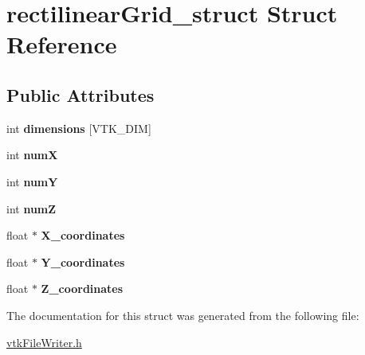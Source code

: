 \hypertarget{structrectilinearGrid__struct}{
\section{rectilinearGrid\_\-struct Struct Reference}
\label{structrectilinearGrid__struct}
}
\subsection*{Public Attributes}
\begin{DoxyCompactItemize}
\item 
\hypertarget{structrectilinearGrid__struct_ad8e386ae3171b95a18b873f47be1631e}{
int {\bfseries dimensions} \mbox{[}VTK\_\-DIM\mbox{]}}
\label{structrectilinearGrid__struct_ad8e386ae3171b95a18b873f47be1631e}

\item 
\hypertarget{structrectilinearGrid__struct_aa44d3f7a3b83d79c852e66b2ce8ba7af}{
int {\bfseries numX}}
\label{structrectilinearGrid__struct_aa44d3f7a3b83d79c852e66b2ce8ba7af}

\item 
\hypertarget{structrectilinearGrid__struct_aea2d967a978039de7bc4bb65dcf9ce59}{
int {\bfseries numY}}
\label{structrectilinearGrid__struct_aea2d967a978039de7bc4bb65dcf9ce59}

\item 
\hypertarget{structrectilinearGrid__struct_a8ffc862507232f3f9e67efa4b147dc00}{
int {\bfseries numZ}}
\label{structrectilinearGrid__struct_a8ffc862507232f3f9e67efa4b147dc00}

\item 
\hypertarget{structrectilinearGrid__struct_aaf1ce68d04f6151ee50e8beb6b932e2b}{
float $\ast$ {\bfseries X\_\-coordinates}}
\label{structrectilinearGrid__struct_aaf1ce68d04f6151ee50e8beb6b932e2b}

\item 
\hypertarget{structrectilinearGrid__struct_a2beefb3c1cefe25f74f366422a897b40}{
float $\ast$ {\bfseries Y\_\-coordinates}}
\label{structrectilinearGrid__struct_a2beefb3c1cefe25f74f366422a897b40}

\item 
\hypertarget{structrectilinearGrid__struct_a0f4018e262ec28e8781932c2e938792e}{
float $\ast$ {\bfseries Z\_\-coordinates}}
\label{structrectilinearGrid__struct_a0f4018e262ec28e8781932c2e938792e}

\end{DoxyCompactItemize}


The documentation for this struct was generated from the following file:\begin{DoxyCompactItemize}
\item 
\hyperlink{vtkFileWriter_8h}{vtkFileWriter.h}\end{DoxyCompactItemize}
